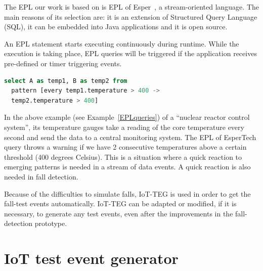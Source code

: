 \documentclass[journal]{IEEEtran}
\begin{document}
The EPL our work is based on is EPL of Esper~\cite{Esper:2016}, a stream-oriented language. The main reasons of its selection are: 
it is an extension of Structured Query Language (SQL), it can be embedded into Java applications and it is open source. 
 
An EPL statement starts executing continuously during runtime. While the execution is taking place, EPL queries will be triggered if the application receives pre-defined or timer triggering events.
 
 \renewcommand{\lstlistingname}{Example}
 
 \begin{lstlisting}[basicstyle=\ttfamily\scriptsize,language=SQL,caption=EPL of EsperTech query example,label=EPLqueries]
select A as temp1, B as temp2 from 
  pattern [every temp1.temperature > 400 -> 
  temp2.temperature > 400]
 \end{lstlisting}
 
In the above example (see Example~\ref{EPLqueries}) of a ``nuclear
reactor control system'', its temperature gauges take a reading of the core temperature every second and send the data 
to a central monitoring system. The EPL of EsperTech query throws a warning if we have 2 consecutive 
temperatures above a certain threshold (400 degrees Celsius). This is a situation where a quick reaction to emerging patterns 
is needed in a stream of data events. A quick reaction is also needed in fall detection. 
 
Because of the difficulties to simulate falls, IoT-TEG is used in
order to get the fall-test events automatically. 
IoT-TEG can be adapted or modified, if it is necessary, to generate any test events, even after the improvements 
in the fall-detection prototype.

\section{IoT test event generator}
\label{iotteg}
\end{document}
